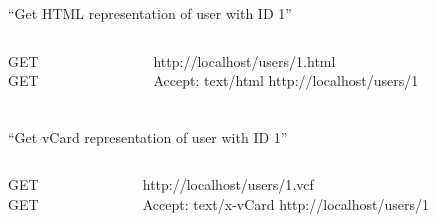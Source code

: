 \begin{frame}
  \frametitle{\insertsection}
  \begin{center}
  ``Get HTML representation of user with ID 1''
  \end{center}
  \begin{columns}
    \begin{column}{.2\textwidth}
      \begin{flushright}
      GET\\
      GET
      \end{flushright}
    \end{column}    
    \begin{column}{.8\textwidth}
      \begin{flushleft}
      http://localhost/users/1\alert{.html}\\
      \alert{Accept: text/html} http://localhost/users/1
      \end{flushleft}
    \end{column}    
  \end{columns}
\end{frame}

\begin{frame}
  \frametitle{\insertsection}
  \begin{center}
  ``Get vCard representation of user with ID 1''
  \end{center}
  \begin{columns}
    \begin{column}{.2\textwidth}
      \begin{flushright}
      GET\\
      GET
      \end{flushright}
    \end{column}    
    \begin{column}{.8\textwidth}
      \begin{flushleft}
      http://localhost/users/1\alert{.vcf}\\
      \alert{Accept: text/x-vCard} http://localhost/users/1
      \end{flushleft}
    \end{column}    
  \end{columns}
\end{frame}

